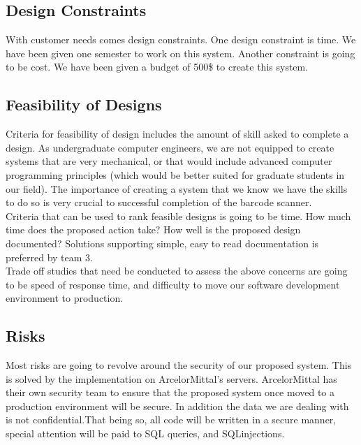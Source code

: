 \documentclass[Letter,11pt]{article}
\begin{document}
	\subsection{Design Constraints}
	With customer needs comes design constraints. One design constraint is time. We have been given one semester to work on this system. Another constraint is going to be cost. We have been given a budget of 500\$ to create this system.\\ 
	\subsection{Feasibility of Designs}
	Criteria for feasibility of design includes the amount of skill asked to complete a design. As undergraduate computer engineers, we are not equipped to create systems that are very mechanical, or that would include advanced computer programming principles (which would be better suited for graduate students in our field). The importance of creating a system that we know we have the skills to do so is very crucial to successful completion of the barcode scanner.  \\
	Criteria that can be used to rank feasible designs is going to be time. How much time does the proposed action take? How well is the proposed design documented? Solutions supporting simple, easy to read documentation is preferred by team 3. \\
	Trade off studies that need be conducted to assess the above concerns are going to be speed of response time, and difficulty to move our software development environment to production.
	\subsection{Risks}
	Most risks are going to revolve around the security of our proposed system. This is solved by the implementation on ArcelorMittal's servers. ArcelorMittal has their own security team to ensure that the proposed system once moved to a production environment will be secure. In addition the data we are dealing with is not confidential.That being so, all code will be written in a secure manner, special attention will be paid to SQL queries, and SQLinjections.   
\end{document}
